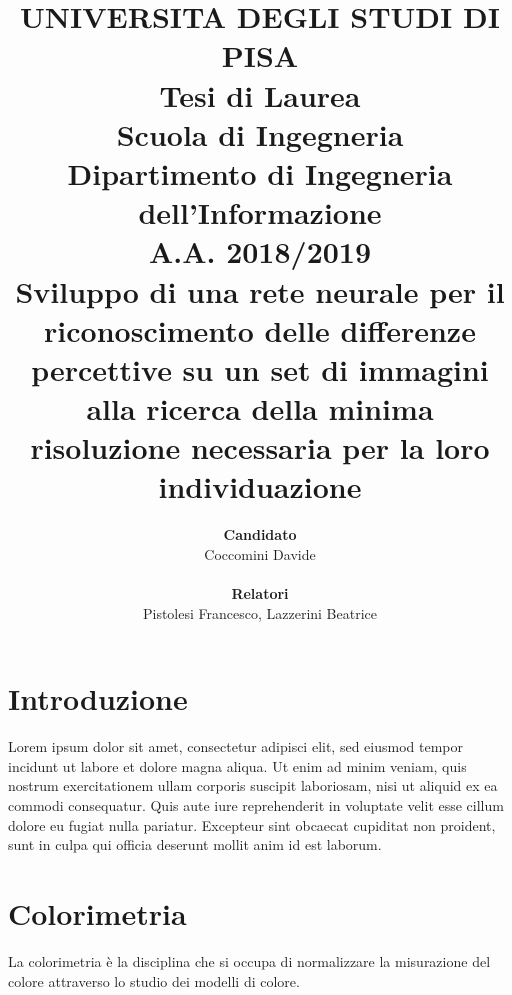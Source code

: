 \documentclass[a4paper,11pt]{article}
\author{
        \textbf{Candidato} \\
        Coccomini Davide \\\\
        \textbf{Relatori}\\
        Pistolesi Francesco, Lazzerini Beatrice \\
    }
\title{\textbf{UNIVERSITA DEGLI STUDI DI PISA} \\[0.4in]
        Tesi di Laurea \\
    Scuola di Ingegneria \\
    Dipartimento di Ingegneria dell’Informazione \\
    A.A. 2018/2019\\[1in]
    Sviluppo di una rete neurale per il riconoscimento delle differenze percettive su un set di immagini alla ricerca della minima risoluzione necessaria per la loro individuazione\\[0.5in]}
\date{}
\begin{document}
    \pagestyle{fancy}
    \fancyhead{} 
    \renewcommand{\headrulewidth}{0pt}
    \fancyfoot{}
    \fancyfoot[LE,RO]{\thepage}    
    \renewcommand{\footrulewidth}{0.4pt}
    \maketitle
    \newpage
        \tableofcontents
        \newpage
        \section{Introduzione}
        Lorem ipsum dolor sit amet, consectetur adipisci elit, 
        sed eiusmod tempor incidunt ut labore et dolore magna aliqua.
        Ut enim ad minim veniam, quis nostrum exercitationem ullam corporis suscipit laboriosam,
        nisi ut aliquid ex ea commodi consequatur. Quis aute iure reprehenderit in voluptate
        velit esse cillum dolore eu fugiat nulla pariatur. Excepteur sint obcaecat cupiditat
        non proident, sunt in culpa qui officia deserunt mollit anim id est laborum.
    
        \section{Colorimetria}
        La colorimetria è la disciplina che si occupa di normalizzare la misurazione del colore attraverso lo studio dei modelli di colore.
\end{document}
